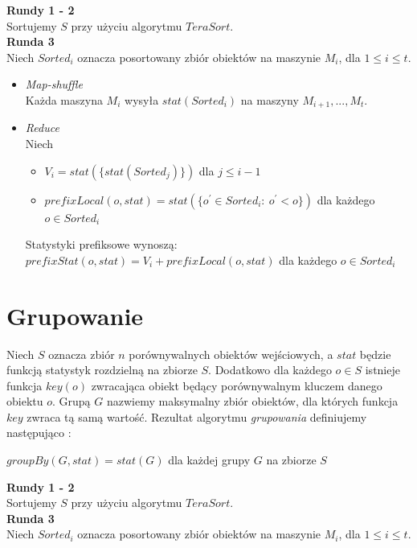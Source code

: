 \documentclass[licencjacka]{pracamgr}
\begin{document}
\textbf{Rundy 1 - 2} \\
Sortujemy \(S\) przy użyciu algorytmu \(TeraSort\). \\

\textbf{Runda 3} \\
Niech \(Sorted_i\) oznacza posortowany zbiór obiektów na maszynie \(M_i\), dla \(1 \leq i \leq t\).
\begin{itemize}
    \item \textit{Map-shuffle} \\
    Każda maszyna \(M_i\) wysyła \(stat(Sorted_i)\) na maszyny \(M_{i+1}, ..., M_t\).
    \item \textit{Reduce} \\
    Niech
    \begin{itemize}
        \item \(V_i = stat(\{stat(Sorted_j)\})\) dla \(j \leq i-1\)
        \item \(prefixLocal(o, stat) = stat(\{o^\prime \in Sorted_i: \ o^\prime < o \})\) dla każdego \(o \in Sorted_i\)
    \end{itemize}
    Statystyki prefiksowe wynoszą: \\
    
    \centering
    \(prefixStat(o, stat) = V_i + prefixLocal(o, stat)\) dla każdego \(o \in Sorted_i\)
\end{itemize}

\section{Grupowanie}
Niech \(S\) oznacza zbiór \(n\) porównywalnych obiektów wejściowych, a \(stat\) będzie funkcją statystyk rozdzielną na zbiorze \(S\). Dodatkowo dla każdego \(o \in S\) istnieje funkcja \(key(o)\) zwracająca obiekt będący porównywalnym kluczem danego obiektu \(o\). Grupą \(G\) nazwiemy maksymalny zbiór obiektów, dla których funkcja \(key\) zwraca tą samą wartość. Rezultat algorytmu \textit{grupowania} definiujemy następująco \cite{tao2013minimal}:
\begin{center}
\(groupBy(G, stat) = stat(G)\) dla każdej grupy \(G\) na zbiorze \(S\) \\
\end{center}

\textbf{Rundy 1 - 2} \\
Sortujemy \(S\) przy użyciu algorytmu \(TeraSort\). \\

\textbf{Runda 3} \\
Niech \(Sorted_i\) oznacza posortowany zbiór obiektów na maszynie \(M_i\), dla \(1 \leq i \leq t\).
\end{document}
